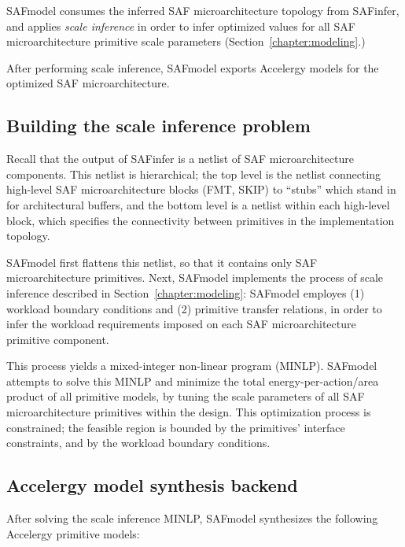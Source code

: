 SAFmodel consumes the inferred SAF microarchitecture topology from SAFinfer, and applies \textit{scale inference} in order to infer optimized values for all SAF microarchitecture primitive scale parameters (Section~\ref{chapter:modeling}.)

After performing scale inference, SAFmodel exports Accelergy models for the optimized SAF microarchitecture.

\subsection{Building the scale inference problem}

Recall that the output of SAFinfer is a netlist of SAF microarchitecture components. This netlist is hierarchical; the top level is the netlist connecting high-level SAF microarchitecture blocks (FMT, SKIP) to ``stubs'' which stand in for architectural buffers, and the bottom level is a netlist within each high-level block, which specifies the connectivity between primitives in the implementation topology.

SAFmodel first flattens this netlist, so that it contains only SAF microarchitecture primitives. Next, SAFmodel implements the process of scale inference described in Section~\ref{chapter:modeling}: SAFmodel employes (1) workload boundary conditions and (2) primitive transfer relations, in order to infer the workload requirements imposed on each SAF microarchitecture primitive component.

This process yields a mixed-integer non-linear program (MINLP). SAFmodel attempts to solve this MINLP and minimize the total energy-per-action/area product of all primitive models, by tuning the scale parameters of all SAF microarchitecture primitives within the design. This optimization process is constrained; the feasible region is bounded by the primitives' interface constraints, and by the workload boundary conditions.

\subsection{Accelergy model synthesis backend}

After solving the scale inference MINLP, SAFmodel synthesizes the following Accelergy primitive models:

